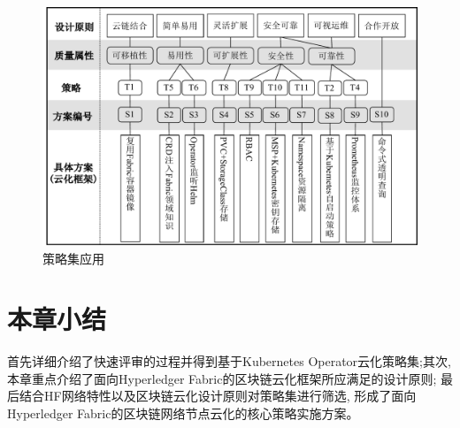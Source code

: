 \begin{figure}[h] %
    \centering %
    \includegraphics[width=1.0\textwidth]{FIGs/chapter3/policy_characteristics.pdf} %
    \caption{策略集应用} %
    \label{policy_set_application} %
\end{figure}%


\section{本章小结}

首先详细介绍了快速评审的过程并得到基于Kubernetes Operator云化策略集;其次, 本章重点介绍了面向Hyperledger Fabric的区块链云化框架所应满足的设计原则; 最后结合HF网络特性以及区块链云化设计原则对策略集进行筛选, 形成了面向Hyperledger Fabric的区块链网络节点云化的核心策略实施方案。